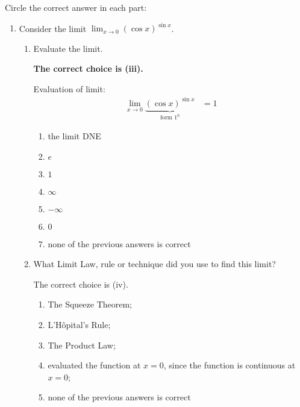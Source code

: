 \documentclass[nooutcomes,handout]{ximera}
\begin{document}
\begin{problem}

  Circle the correct answer in each part:
  \begin{enumerate}
    \item
      Consider the limit $\lim_{x \to 0} (\cos x)^{\sin x}$.
      \begin{enumerate}
        \item
          Evaluate the limit.
          \begin{freeResponse}
            \textbf{The correct choice is (iii).}

            Evaluation of limit:
            \begin{align*}
              \lim_{x \to 0} \underbrace{(\cos x)^{\sin x}}_{\text{form $1^0$}} &= 1
            \end{align*}
          \end{freeResponse}
          \begin{enumerate}
            \item
              the limit DNE
            \item
              $e$
             \item
              $1$
            \item
              $\infty$
            \item
              $-\infty$
            \item
              $0$
            \item
              none of the previous answers is correct
          \end{enumerate}
        \item
          What Limit Law, rule or technique did you use to find this limit?
          \begin{freeResponse}
            The correct choice is (iv).
          \end{freeResponse}
          \begin{enumerate}
            \item
              The Squeeze Theorem;
            \item
              L'H\^{o}pital's Rule;
            \item
              The Product Law;
            \item
              evaluated the function at $x = 0$, since the function is continuous at $x = 0$;
            \item
              none of the previous answers is correct
          \end{enumerate}
      \end{enumerate}


\end{enumerate}
\end{problem}
\end{document}
